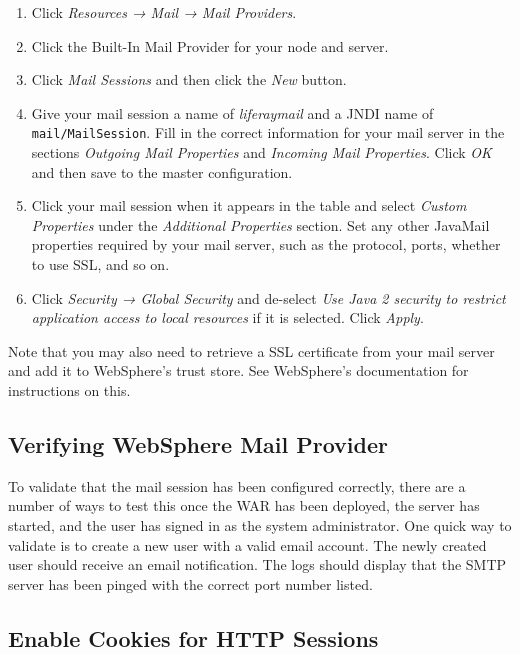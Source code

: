 \begin{enumerate}
\def\labelenumi{\arabic{enumi}.}
\item
  Click \emph{Resources → Mail → Mail Providers}.
\item
  Click the Built-In Mail Provider for your node and server.
\item
  Click \emph{Mail Sessions} and then click the \emph{New} button.
\item
  Give your mail session a name of \emph{liferaymail} and a JNDI name of
  \texttt{mail/MailSession}. Fill in the correct information for your
  mail server in the sections \emph{Outgoing Mail Properties} and
  \emph{Incoming Mail Properties}. Click \emph{OK} and then save to the
  master configuration.
\item
  Click your mail session when it appears in the table and select
  \emph{Custom Properties} under the \emph{Additional Properties}
  section. Set any other JavaMail properties required by your mail
  server, such as the protocol, ports, whether to use SSL, and so on.
\item
  Click \emph{Security → Global Security} and de-select \emph{Use Java 2
  security to restrict application access to local resources} if it is
  selected. Click \emph{Apply}.
\end{enumerate}

Note that you may also need to retrieve a SSL certificate from your mail
server and add it to WebSphere's trust store. See WebSphere's
documentation for instructions on this.

\subsection{Verifying WebSphere Mail
Provider}\label{verifying-websphere-mail-provider}

To validate that the mail session has been configured correctly, there
are a number of ways to test this once the WAR has been deployed, the
server has started, and the user has signed in as the system
administrator. One quick way to validate is to create a new user with a
valid email account. The newly created user should receive an email
notification. The logs should display that the SMTP server has been
pinged with the correct port number listed.

\subsection{Enable Cookies for HTTP
Sessions}\label{enable-cookies-for-http-sessions}

